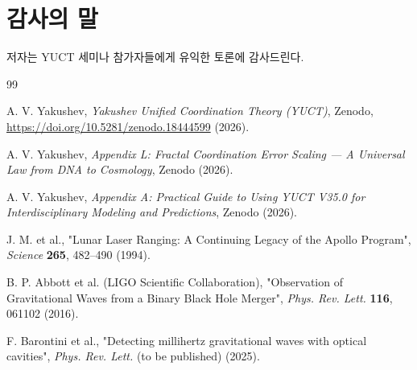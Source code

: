 \documentclass[12pt,a4paper]{article}
\begin{document}
	\section*{감사의 말}
	
	저자는 YUCT 세미나 참가자들에게 유익한 토론에 감사드린다.
	
	\begin{thebibliography}{99}
		
		A. V. Yakushev, \emph{Yakushev Unified Coordination Theory (YUCT)}, Zenodo, \url{https://doi.org/10.5281/zenodo.18444599} (2026).
		
		A. V. Yakushev, \emph{Appendix L: Fractal Coordination Error Scaling — A Universal Law from DNA to Cosmology}, Zenodo (2026).
		
		A. V. Yakushev, \emph{Appendix A: Practical Guide to Using YUCT V35.0 for Interdisciplinary Modeling and Predictions}, Zenodo (2026).
		
		J. M. et al., "Lunar Laser Ranging: A Continuing Legacy of the Apollo Program", \emph{Science} \textbf{265}, 482–490 (1994).
		
		B. P. Abbott et al. (LIGO Scientific Collaboration), "Observation of Gravitational Waves from a Binary Black Hole Merger", \emph{Phys. Rev. Lett.} \textbf{116}, 061102 (2016).
		
		F. Barontini et al., "Detecting millihertz gravitational waves with optical cavities", \emph{Phys. Rev. Lett.} (to be published) (2025).
		
	\end{thebibliography}
	
\end{document}
